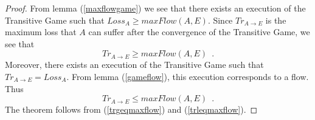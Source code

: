 \begin{proof}%
   From lemma (\ref{maxflowgame}) we see that there exists an execution of the Transitive Game such that
   $Loss_A \geq maxFlow\left(A, E\right)$.
   Since $Tr_{A \rightarrow E}$ is the maximum loss that $A$ can suffer after the convergence of the Transitive Game, we
   see that
   \begin{equation}
   \label{trgeqmaxflow}
      Tr_{A \rightarrow E} \geq maxFlow\left(A, E\right) \enspace.
   \end{equation}
   Moreover, there exists an execution of the Transitive Game such that $Tr_{A \rightarrow E} = Loss_A$.
   From lemma (\ref{gameflow}), this execution corresponds to a flow. Thus
   \begin{equation}
   \label{trleqmaxflow}
      Tr_{A \rightarrow E} \leq maxFlow\left(A, E\right) \enspace.
   \end{equation}
   The theorem follows from (\ref{trgeqmaxflow}) and (\ref{trleqmaxflow}).
\end{proof}
